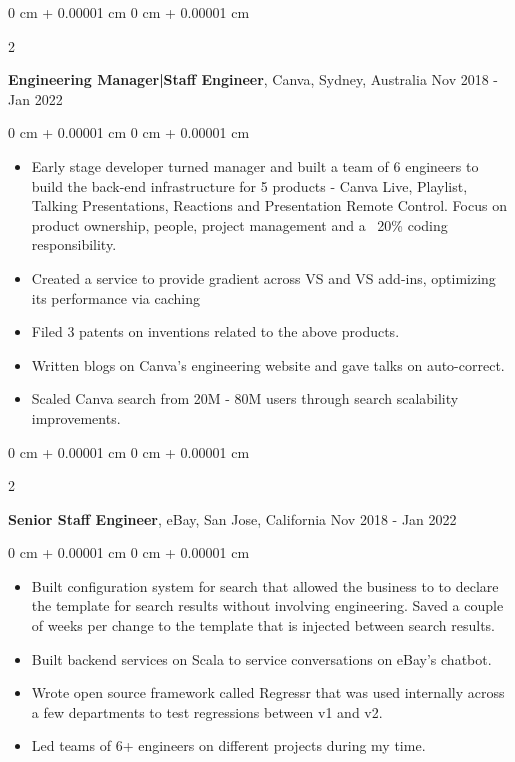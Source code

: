 \documentclass[10pt, letterpaper]{article}
\newenvironment{highlights}{
    \begin{itemize}[
        topsep=0.10 cm,
        parsep=0.10 cm,
        partopsep=0pt,
        itemsep=0pt,
        leftmargin=0 cm + 10pt
    ]
}{
    \end{itemize}
} %
\newenvironment{onecolentry}{
    \begin{adjustwidth}{
        0 cm + 0.00001 cm
    }{
        0 cm + 0.00001 cm
    }
}{
    \end{adjustwidth}
} %
\newenvironment{twocolentry}[2][]{
    \onecolentry
    \def\secondColumn{#2}
    \setcolumnwidth{\fill, 4.5 cm}
    \begin{paracol}{2}
}{
    \switchcolumn \raggedleft \secondColumn
    \end{paracol}
    \endonecolentry
} %
\begin{document}
        \begin{twocolentry}{
            Nov 2018 - Jan 2022
        }
            \textbf{Engineering Manager|Staff Engineer}, Canva, Sydney, Australia\end{twocolentry}

        \vspace{0.10 cm}
        \begin{onecolentry}
            \begin{highlights}
                \item Early stage developer turned manager and built a team of 6 engineers to build the back-end infrastructure for 5 products - Canva Live, Playlist, Talking Presentations, Reactions and Presentation Remote Control. Focus on product ownership, people, project management and a ~20\% coding responsibility.
                \item Created a service to provide gradient across VS and VS add-ins, optimizing its performance via caching
                \item Filed 3 patents on inventions related to the above products.
                \item Written blogs on Canva's engineering website and gave talks on auto-correct.
                \item Scaled Canva search from 20M - 80M users through search scalability improvements.
            \end{highlights}
        \end{onecolentry}

        \vspace{0.15 cm}
        \begin{twocolentry}{
            Nov 2018 - Jan 2022
        }
            \textbf{Senior Staff Engineer}, eBay, San Jose, California\end{twocolentry}
        \vspace{0.10 cm}
        \begin{onecolentry}
            \begin{highlights}
                \item Built configuration system for search that allowed the business to to declare the template for search results without involving engineering. Saved a couple of weeks per change to the template that is injected between search results.
                \item Built backend services on Scala to service conversations on eBay's chatbot.
                \item Wrote open source framework called Regressr that was used internally across a few departments to test regressions between v1 and v2.
                \item Led teams of 6+ engineers on different projects during my time.
            \end{highlights}
        \end{onecolentry}
\end{document}
